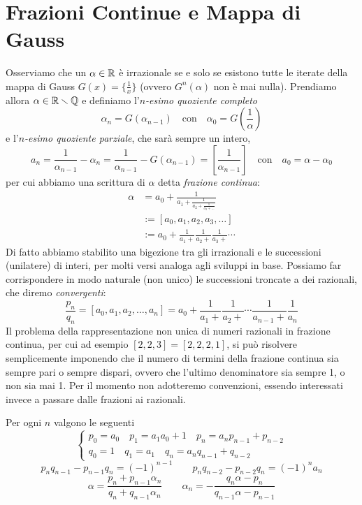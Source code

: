 \section{Frazioni Continue e Mappa di Gauss}

Osserviamo che un $\alpha\in\mathbb{R}$  \`e irrazionale se e solo se esistono tutte le iterate della mappa di Gauss $G(x)=\{\frac{1}{x}\}$ (ovvero $G^n(\alpha)$ non  \`e mai nulla). Prendiamo allora $\alpha\in\mathbb{R}\smallsetminus\mathbb{Q}$ e definiamo l'$n$\emph{-esimo quoziente completo}
\[\alpha_n=G(\alpha_{n-1}) \quad\mbox{con}\quad \alpha_0=G\left(\frac{1}{\alpha}\right)\]
e l'$n$\emph{-esimo quoziente parziale}, che sar\`a sempre un intero,
\[a_n=\frac{1}{\alpha_{n-1}}-\alpha_n=\frac{1}{\alpha_{n-1}}-G(\alpha_{n-1})=\left[\frac{1}{\alpha_{n-1}}\right] \quad \mbox{con} \quad a_0=\alpha-\alpha_0\]
per cui abbiamo una scrittura di $\alpha$ detta \emph{frazione continua}:
\[\begin{split}
\alpha&=a_0+\frac{1}{a_1+\frac{1}{a_2+\frac{1}{a_3+\dots}}}\\
      &:=[a_0,a_1,a_2,a_3,\dots]\\
      &:=a_0+\frac{1}{a_1+}\frac{1}{a_2+}\frac{1}{a_3+}\cdots
\end{split}\]
Di fatto abbiamo stabilito una bigezione tra gli irrazionali e le successioni (unilatere) di interi, per molti versi analoga agli sviluppi in base. 
Possiamo far corrispondere in modo naturale (non unico) le successioni troncate a dei razionali, che diremo \emph{convergenti}:
\[\frac{p_n}{q_n}=[a_0,a_1,a_2,\dots,a_n]=a_0+\frac{1}{a_1+}\frac{1}{a_2+}\cdots\frac{1}{a_{n-1}+}\frac{1}{a_n}\]
Il problema della rappresentazione non unica di numeri razionali in frazione continua, per cui ad esempio $[2,2,3]=[2,2,2,1]$, 
si pu\`o risolvere semplicemente imponendo che il numero di termini della frazione continua sia sempre pari o sempre dispari, 
ovvero che l'ultimo denominatore sia sempre 1, o non sia mai 1. 
Per il momento non adotteremo convenzioni, essendo interessati invece a passare dalle frazioni ai razionali.

\begin{teo} Per ogni $n$ valgono le seguenti
\[\begin{cases}
   p_0=a_0 \quad p_1=a_1a_0+1 \quad p_{n}=a_np_{n-1}+p_{n-2}\\
   q_0=1 \quad q_1=a_1 \quad q_{n}=a_nq_{n-1}+q_{n-2}
  \end{cases}\]
\[p_nq_{n-1}-p_{n-1}q_n=(-1)^{n-1} \qquad p_nq_{n-2}-p_{n-2}q_n=(-1)^na_n\]
\[\alpha=\frac{p_n+p_{n-1}\alpha_n}{q_n+q_{n-1}\alpha_n} \qquad \alpha_n=-\frac{q_n\alpha-p_n}{q_{n-1}\alpha-p_{n-1}}\]
\end{teo}

